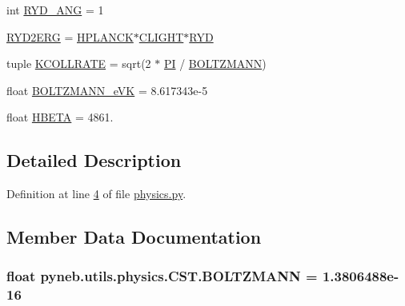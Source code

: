\begin{DoxyCompactItemize}
\item 
int \hyperlink{classpyneb_1_1utils_1_1physics_1_1_c_s_t_a43417605886b2dc4060af9388d7990bd}{R\+Y\+D\+\_\+\+A\+N\+G} = 1
\item 
\hyperlink{classpyneb_1_1utils_1_1physics_1_1_c_s_t_a3da260eac736f7d74c20f76f79239425}{R\+Y\+D2\+E\+R\+G} = \hyperlink{classpyneb_1_1utils_1_1physics_1_1_c_s_t_a00251eede3f56eadeb766c97f3144c55}{H\+P\+L\+A\+N\+C\+K}$\ast$\hyperlink{classpyneb_1_1utils_1_1physics_1_1_c_s_t_a316a5d8a7c983441bd40589f040f3a09}{C\+L\+I\+G\+H\+T}$\ast$\hyperlink{classpyneb_1_1utils_1_1physics_1_1_c_s_t_a468e4f9fac1fbd71b5ca458a84ae05cc}{R\+Y\+D}
\item 
tuple \hyperlink{classpyneb_1_1utils_1_1physics_1_1_c_s_t_a7f947f81f3596cb129cec85e6ecb78e7}{K\+C\+O\+L\+L\+R\+A\+T\+E} = sqrt(2 $\ast$ \hyperlink{classpyneb_1_1utils_1_1physics_1_1_c_s_t_adeb7151ce462944ff7a0ff2803f873c3}{P\+I} / \hyperlink{classpyneb_1_1utils_1_1physics_1_1_c_s_t_aee0d21a1f9edd72e75c5369bd5bc36b9}{B\+O\+L\+T\+Z\+M\+A\+N\+N})
\item 
float \hyperlink{classpyneb_1_1utils_1_1physics_1_1_c_s_t_aa08a3a7d69c5377fa02f0129aeec8526}{B\+O\+L\+T\+Z\+M\+A\+N\+N\+\_\+e\+V\+K} = 8.\+617343e-\/5
\item 
float \hyperlink{classpyneb_1_1utils_1_1physics_1_1_c_s_t_a969cf775617cba19633611eb7fc1b10b}{H\+B\+E\+T\+A} = 4861.
\end{DoxyCompactItemize}


\subsection{Detailed Description}


Definition at line \hyperlink{physics_8py_source_l00004}{4} of file \hyperlink{physics_8py_source}{physics.\+py}.



\subsection{Member Data Documentation}
\hypertarget{classpyneb_1_1utils_1_1physics_1_1_c_s_t_aee0d21a1f9edd72e75c5369bd5bc36b9}{}
\subsubsection[{B\+O\+L\+T\+Z\+M\+A\+N\+N}]{\setlength{\rightskip}{0pt plus 5cm}float pyneb.\+utils.\+physics.\+C\+S\+T.\+B\+O\+L\+T\+Z\+M\+A\+N\+N = 1.\+3806488e-\/16\hspace{0.3cm}{\ttfamily [static]}}\label{classpyneb_1_1utils_1_1physics_1_1_c_s_t_aee0d21a1f9edd72e75c5369bd5bc36b9}



